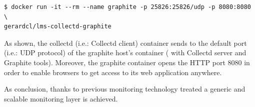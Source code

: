 \begin{verbatim}
$ docker run -it --rm --name graphite -p 25826:25826/udp -p 8080:8080 \
gerardcl/lms-collectd-graphite
\end{verbatim}

As shown, the collectd (i.e.: Collectd client) container sends to the default port (i.e.: UDP protocol) of the graphite host's container ( with Collectd server and Graphite tools). Moreover, the graphite container opens the HTTP port 8080 in order to enable browsers to get access to its web application anywhere. 

As conclusion, thanks to previous monitoring technology treated a generic and scalable monitoring layer is achieved.
